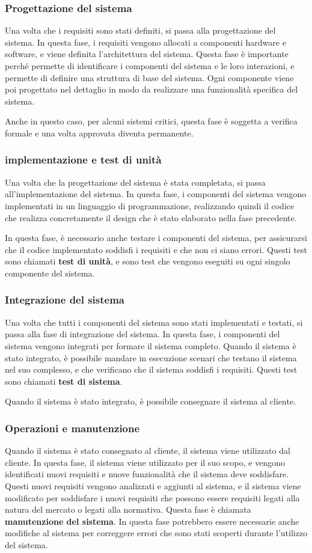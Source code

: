 \subsubsection{Progettazione del sistema}
Una volta che i requisiti sono stati definiti, si passa alla progettazione del sistema.
In questa fase, i requisiti vengono allocati a componenti hardware e software, e viene
definita l'architettura del sistema. Questa fase è importante perché permette di
identificare i componenti del sistema e le loro interazioni, e permette di definire
una struttura di base del sistema. Ogni componente viene poi progettato 
nel dettaglio in modo da realizzare una funzionalità specifica del sistema. 

Anche in questo caso, per alcuni sistemi critici, questa fase è soggetta a verifica formale e 
una volta approvata diventa permanente.
\subsubsection{implementazione e test di unità}
Una volta che la progettazione del sistema è stata completata, si passa all'implementazione
del sistema. In questa fase, i componenti del sistema vengono implementati in un linguaggio
di programmazione, realizzando quindi il codice che realizza concretamente il design 
che è stato elaborato nella fase precedente.

In questa fase, è necessario anche testare i componenti del sistema, per assicurarsi che
il codice implementato soddisfi i requisiti e che non ci siano errori. Questi test
sono chiamati \textbf{test di unità}, e sono test che vengono eseguiti su ogni singolo
componente del sistema. 
\subsubsection{Integrazione del sistema}
Una volta che tutti i componenti del sistema sono stati implementati e testati, si passa
alla fase di integrazione del sistema. In questa fase, i componenti del sistema vengono
integrati per formare il sistema completo. Quando il sistema è stato integrato, è 
possibile mandare in esecuzione scenari che testano il sistema nel suo complesso, e che
verificano che il sistema soddisfi i requisiti. Questi test sono chiamati \textbf{test di
sistema}.

Quando il sistema è stato integrato, è possibile consegnare il sistema al cliente.
\subsubsection{Operazioni e manutenzione}
Quando il sistema è stato consegnato al cliente, il sistema viene utilizzato dal cliente.
In questa fase, il sistema viene utilizzato per il suo scopo, e vengono identificati
nuovi requisiti e nuove funzionalità che il sistema deve soddisfare. Questi nuovi requisiti
vengono analizzati e aggiunti al sistema, e il sistema viene modificato per soddisfare
i nuovi requisiti che possono essere requisiti legati alla natura del mercato o 
legati alla normativa. Questa fase è chiamata \textbf{manutenzione del sistema}.
In questa fase potrebbero essere necessarie anche modifiche al sistema per correggere
errori che sono stati scoperti durante l'utilizzo del sistema.
